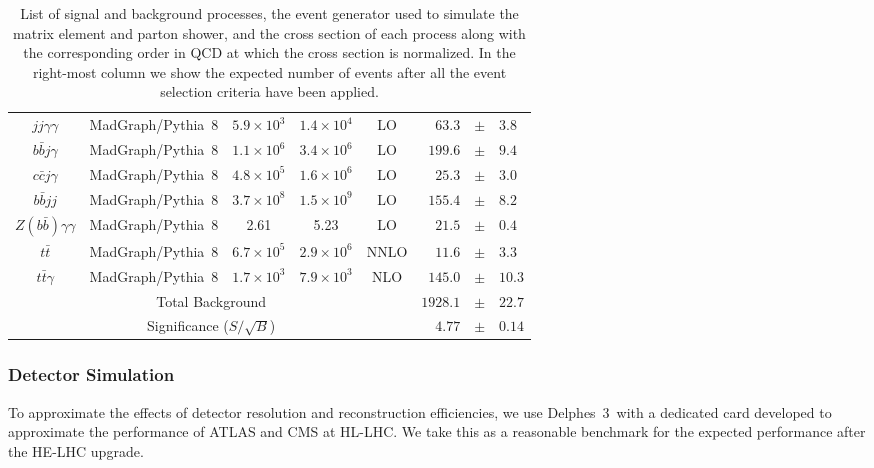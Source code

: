 \begin{table}
\begin{tabular}{|c|c|cc|c|rcl|}
$jj\gamma\gamma$              			& {\sc\small MadGraph}/{\sc\small Pythia~8} 	& $5.9\times 10^{3}$     & $1.4\times 10^{4}$     & LO 					& $63.3$ 		& $\pm$ & $3.8$ \\
$b\bar{b}j\gamma$             			& {\sc\small MadGraph}/{\sc\small Pythia~8} 	& $1.1\times 10^{6}$     & $3.4\times 10^{6}$     & LO 					& $199.6$ 	& $\pm$ & $9.4$ \\
$c\bar{c}j\gamma$             			& {\sc\small MadGraph}/{\sc\small Pythia~8} 	& $4.8\times 10^{5}$     	& $1.6\times 10^{6}$     & LO 				& $25.3$ 		& $\pm$ & $3.0$ \\
$b\bar{b}jj$                  					& {\sc\small MadGraph}/{\sc\small Pythia~8} 	& $3.7\times 10^{8}$     	& $1.5\times 10^{9}$     & LO 				& $155.4$ 	& $\pm$ & $8.2$ \\
$Z(b\bar{b})\gamma\gamma$   		& {\sc\small MadGraph}/{\sc\small Pythia~8} 	& 2.61     			& 5.23      			& LO 											& $21.5$ 		& $\pm$ & $0.4$ \\ \hline
$t\bar{t}$                    					& {\sc\small MadGraph}/{\sc\small Pythia~8} 	& $6.7\times 10^{5}$     	& $2.9\times 10^{6}$     	& NNLO 		& $11.6$ 		& $\pm$ & $3.3$ \\
$t\bar{t}\gamma$              				& {\sc\small MadGraph}/{\sc\small Pythia~8} 	& $1.7\times 10^{3}$     	& $7.9\times 10^{3}$     & NLO 				& $145.0$ 	& $\pm$ & $10.3$ \\ \hline
\multicolumn{5}{|c|}{Total Background}					& $1928.1$ & $\pm$ & $22.7$ \\ \hline
\multicolumn{5}{|c|}{Significance ($S/\sqrt{B}$)}		& $4.77$ & $\pm$ & $0.14$ \\ \hline
\end{tabular}
\caption{List of signal and background processes, the event generator used to simulate the matrix element and parton shower, and the cross section of each process along with the corresponding order in QCD at which the cross section is normalized. In the right-most column we show the expected number of events after all the event selection criteria have been applied.}
\label{t.backgrounds}
\end{table}
\endgroup

\subsubsection{Detector Simulation}

To approximate the effects of detector resolution and reconstruction efficiencies, we use {\sc\small Delphes~3}\ with a dedicated card developed to approximate the performance of ATLAS and CMS at HL-LHC. We take this as a reasonable benchmark for the expected performance after the HE-LHC upgrade.

